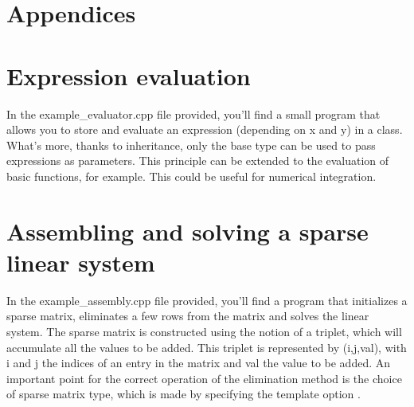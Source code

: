 \documentclass[english,10pt,a4paper]{article}
\begin{document}
\section*{Appendices}

\section*{Expression evaluation}
In the example\_evaluator.cpp file provided, you'll find a small program that allows you to store and evaluate an expression (depending on x and y) in a class.
What's more, thanks to inheritance, only the base type can be used to pass expressions as parameters.
This principle can be extended to the evaluation of basic functions, for example.
This could be useful for numerical integration.

\section*{Assembling and solving a sparse linear system}

In the example\_assembly.cpp file provided, you'll find a program that initializes a sparse matrix, eliminates a few rows from the matrix and solves the linear system.
The sparse matrix is constructed using the notion of a triplet, which will accumulate all the values to be added.
This triplet is represented by (i,j,val), with i and j the indices of an entry in the matrix and val the value to be added.
An important point for the correct operation of the elimination method is the choice of sparse matrix type, which is made by specifying the template option .
\end{document}
